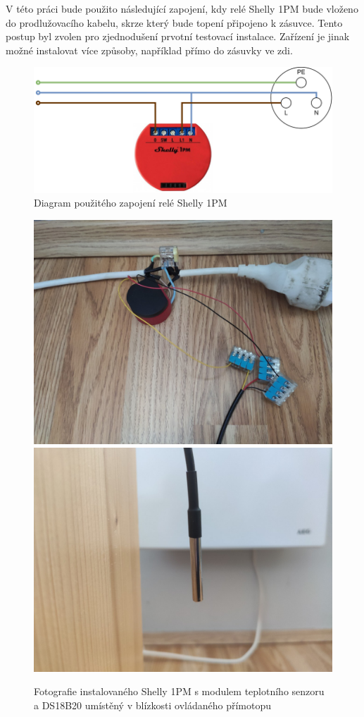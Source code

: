 V této práci bude použito následující zapojení, kdy relé Shelly 1PM bude vloženo do prodlužovacího kabelu, skrze který bude topení připojeno k zásuvce. Tento postup byl zvolen pro zjednodušení prvotní testovací instalace. Zařízení je jinak možné instalovat více způsoby, například přímo do zásuvky ve zdi.

\begin{figure}[hbt]
\centering
\includegraphics{obrazky-figures/shelly-diagram.png}
\caption{Diagram použitého zapojení relé Shelly 1PM}
\end{figure}

\begin{figure}[hbt]
\centering
\includegraphics[width=0.44\linewidth]{obrazky-figures/shelly-photo1.png}
\includegraphics[width=0.44\linewidth]{obrazky-figures/shelly-photo2.png}
\caption{Fotografie instalovaného Shelly 1PM s modulem teplotního senzoru a DS18B20 umístěný v blízkosti ovládaného přímotopu}
\end{figure}

